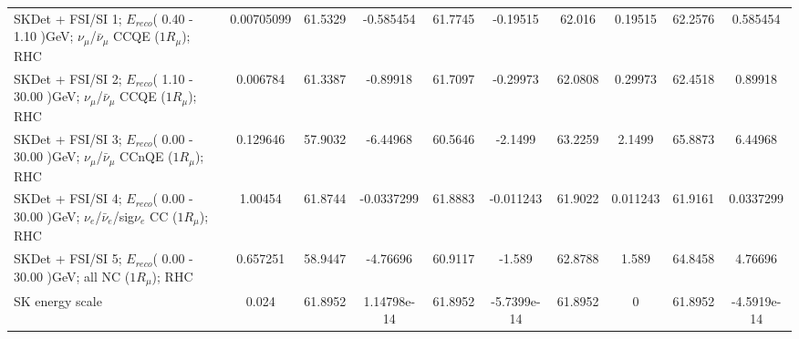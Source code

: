 \begin{tabular}{| l | S | S  S | S  S | S  S | S  S | }
SKDet + FSI/SI  1; $E_{reco}$( 0.40 - 1.10 )GeV; $\nu_{\mu}$/$\bar{\nu}_{\mu}$ CCQE ($1R_{\mu}$); RHC &      0.00705099 &         61.5329 &       -0.585454 &         61.7745 &        -0.19515 &          62.016 &         0.19515 &         62.2576 &        0.585454 \\ 
SKDet + FSI/SI  2; $E_{reco}$( 1.10 - 30.00 )GeV; $\nu_{\mu}$/$\bar{\nu}_{\mu}$ CCQE ($1R_{\mu}$); RHC &        0.006784 &         61.3387 &        -0.89918 &         61.7097 &        -0.29973 &         62.0808 &         0.29973 &         62.4518 &         0.89918 \\ 
SKDet + FSI/SI  3; $E_{reco}$( 0.00 - 30.00 )GeV; $\nu_{\mu}$/$\bar{\nu}_{\mu}$ CCnQE ($1R_{\mu}$); RHC &        0.129646 &         57.9032 &        -6.44968 &         60.5646 &         -2.1499 &         63.2259 &          2.1499 &         65.8873 &         6.44968 \\ 
SKDet + FSI/SI  4; $E_{reco}$( 0.00 - 30.00 )GeV; $\nu_{e}$/$\bar{\nu}_{e}$/sig$\nu_{e}$ CC ($1R_{\mu}$); RHC &         1.00454 &         61.8744 &      -0.0337299 &         61.8883 &       -0.011243 &         61.9022 &        0.011243 &         61.9161 &       0.0337299 \\ 
      SKDet + FSI/SI  5; $E_{reco}$( 0.00 - 30.00 )GeV; all NC ($1R_{\mu}$); RHC &        0.657251 &         58.9447 &        -4.76696 &         60.9117 &          -1.589 &         62.8788 &           1.589 &         64.8458 &         4.76696 \\ 
                                                                 SK energy scale &           0.024 &         61.8952 &     1.14798e-14 &         61.8952 &     -5.7399e-14 &         61.8952 &               0 &         61.8952 &     -4.5919e-14 \\ 
\bottomrule
\end{tabular}

